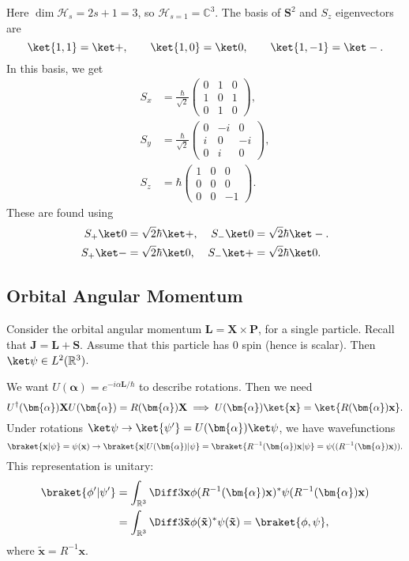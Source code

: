 \documentclass[12pt]{article}
\begin{document}
Here $\dim \mathcal{H}_s = 2s + 1 = 3$, so $\mathcal{H}_{s=1} = \mathbb{C}^3$. The basis of $\mathbf{S}^2$ and $S_z$ eigenvectors are
\[
	\ket{1,1} = \ket +, \qquad \ket{1, 0} = \ket 0, \qquad \ket{1, -1} = \ket -.
\]
In this basis, we get
\begin{align*}
	S_x &= \frac{\hbar}{\sqrt 2}
	\begin{pmatrix}
		0&1&0\\1&0&1\\0&1&0
	\end{pmatrix}
	,\\
	S_y&=\frac{\hbar}{\sqrt2}
	\begin{pmatrix}
		0&-i&0\\i&0&-i\\0&i&0
	\end{pmatrix}
	,\\
	S_z&=\hbar
	\begin{pmatrix}
		1&0&0\\0&0&0\\0&0&-1
	\end{pmatrix}.
\end{align*}
These are found using
\begin{align*}
	S_+ \ket 0 &= \sqrt 2\hbar \ket +, & S_- \ket 0 &= \sqrt 2 \hbar \ket -. \\
	S_+ \ket - &= \sqrt 2 \hbar \ket 0, & S_-\ket + &= \sqrt 2 \hbar \ket 0.
\end{align*}

\subsection{Orbital Angular Momentum}
\label{sub:orb_ang_mom}

Consider the orbital angular momentum $\mathbf{L} = \mathbf{X} \times \mathbf{P}$, for a single particle. Recall that $\mathbf{J} = \mathbf{L} + \mathbf{S}$. Assume that this particle has 0 spin (hence is scalar). Then $\ket \psi \in L^2(\mathbb{R}^3)$.

We want $U(\bm{\alpha}) = e^{-i \alpha \mathbf{L}/\hbar}$ to describe rotations. Then we need
\[
	U^{\dagger}(\bm{\alpha}) \mathbf{X} U(\bm{\alpha}) = R(\bm{\alpha})\mathbf{X} \implies U(\bm{\alpha})\ket{\mathbf{x}} = \ket{R(\bm{\alpha})\mathbf{x}}.
\]
Under rotations $\ket \psi \to \ket{\psi'} = U(\bm{\alpha}) \ket \psi$, we have wavefunctions
\[
	\braket{\mathbf{x}|\psi} = \psi(\mathbf{x}) \to \braket{\mathbf{x}|U(\bm{\alpha})|\psi} = \braket{R^{-1}(\bm{\alpha})\mathbf{x}|\psi}=\psi((R^{-1}(\bm{\alpha})\mathbf{x})).
\]
This representation is unitary:
\begin{align*}
	\braket{\phi'|\psi'} &= \int_{\mathbb{R}^3} \Diff3 \mathbf{x} \phi(R^{-1}(\bm{\alpha})\mathbf{x})^{\ast} \psi(R^{-1}(\bm{\alpha})\mathbf{x}) \\
			     &= \int_{\mathbb{R}^3} \Diff3 \mathbf{\tilde x} \phi(\mathbf{\tilde x})^{\ast} \psi(\mathbf{\tilde x}) = \braket{\phi, \psi},
\end{align*}
where $\mathbf{\tilde x} = R^{-1} \mathbf{x}$.
\end{document}
